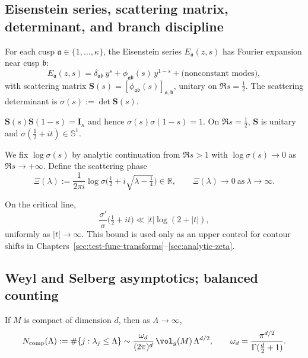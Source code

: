 \subsection{Eisenstein series, scattering matrix, determinant, and branch discipline}\relax \hspace{0pt}
\label{subsec:eisenstein-scattering}
\begin{definition}\label{def:eisenstein}\relax
For each cusp $\mathfrak{a}\in\{1,\dots,\kappa\}$, the Eisenstein series $E_{\mathfrak{a}}(z,s)$ has Fourier expansion near cusp $\mathfrak{b}$:
\[
  E_{\mathfrak{a}}(z,s)=\delta_{\mathfrak{a}\mathfrak{b}}\,y^s+\phi_{\mathfrak{a}\mathfrak{b}}(s)\,y^{1-s}+\text{(nonconstant modes)},
\]
with scattering matrix $\mathbf{S}(s)=[\phi_{\mathfrak{a}\mathfrak{b}}(s)]_{\mathfrak{a},\mathfrak{b}}$, unitary on $\Re s=\tfrac12$. The scattering determinant is $\sigma(s):=\det\mathbf{S}(s)$. %
\end{definition}

\begin{lemma}\label{lem:s-unitarity}\relax
$\mathbf{S}(s)\mathbf{S}(1-s)=\mathbf{I}_\kappa$ and hence $\sigma(s)\sigma(1-s)=1$. On $\Re s=\tfrac12$, $\mathbf{S}$ is unitary and $\sigma(\tfrac12+it)\in \mathbb{S}^1$. %
\end{lemma}

\begin{definition}\label{def:branch}\relax
We fix $\log\sigma(s)$ by analytic continuation from $\Re s>1$ with $\log\sigma(s)\to 0$ as $\Re s\to+\infty$. Define the scattering phase
\[
  \Xi(\lambda):=\frac{1}{2\pi i}\log\sigma\Big(\tfrac12+i\sqrt{\lambda-\tfrac14}\Big)\in\mathbb{R},\qquad \Xi(\lambda)\to 0\ \text{as}\ \lambda\to\infty.
\]
\end{definition}

\begin{remark}\label{rem:sigma-growth}\relax
On the critical line,
\[
  \frac{\sigma'}{\sigma}\Big(\tfrac12+it\Big)\ll |t|\log(2+|t|),
\]
uniformly as $|t|\to\infty$. This bound is used only as an upper control for contour shifts in Chapters~\ref{sec:test-func-transforms}–\ref{sec:analytic-zeta}. %
\end{remark}

\subsection{Weyl and Selberg asymptotics; balanced counting}\relax \hspace{0pt}
\label{subsec:weyl-selberg}
\begin{theorem}\label{thm:weyl-compact}\relax
If $M$ is compact of dimension $d$, then as $\Lambda\to\infty$,
\[
  N_{\mathrm{comp}}(\Lambda):=\#\{j:\lambda_j\le \Lambda\}
  \sim \frac{\omega_d}{(2\pi)^d}\,\vol_g(M)\,\Lambda^{d/2},\qquad 
  \omega_d=\frac{\pi^{d/2}}{\Gamma(\tfrac d2+1)}.
\]
\end{theorem}

